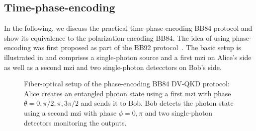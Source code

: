 \FloatBarrier
\subsection{Time-phase-encoding}

In the following, we discuss the practical time-phase-encoding BB84 protocol and show its equivalence to the polarization-encoding BB84.
The idea of using phase-encoding was first proposed as part of the BB92 protocol~\cite{Bennett1992}.
The basic setup is illustrated in  and comprises a single-photon source and a first \gls{mzi} on Alice's side as well as a second \gls{mzi} and two single-photon detecctors on Bob's side.
\begin{figure}[htb]
	\centering
	
	\caption{Fiber-optical setup of the phase-encoding BB84 DV-QKD protocol: Alice creates an entangled photon state using a first \gls{mzi} with phase $\theta=0,\pi/2,\pi,3\pi/2$ and sends it to Bob. Bob detects the photon state using a second \gls{mzi} with phase $\phi=0,\pi$ and two single-photon detectors monitoring the outputs.}\label{fig:time_phase_encoding_bb84}
\end{figure}

